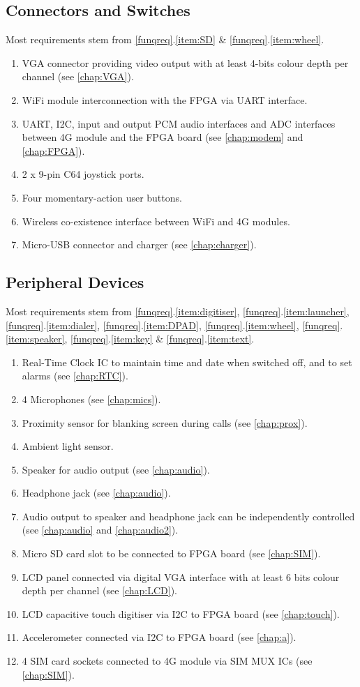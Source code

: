 \subsection{Connectors and Switches}
Most requirements stem from \ref{funqreq}.\ref{item:SD} \& \ref{funqreq}.\ref{item:wheel}.
\begin{enumerate}
\item VGA connector providing video output with at least 4-bits colour depth per channel (see \autoref{chap:VGA}).
\item WiFi module interconnection with the FPGA via UART interface.
\item UART, I2C, input and output PCM audio interfaces and ADC interfaces between 4G module and the FPGA board (see \autoref{chap:modem} and \autoref{chap:FPGA}).
\item 2 x 9-pin C64 joystick ports.
\item Four momentary-action user buttons.
\item Wireless co-existence interface between WiFi and 4G modules.
\item Micro-USB connector and charger (see \autoref{chap:charger}).
\end{enumerate}

\subsection{Peripheral Devices}
Most requirements stem from \ref{funqreq}.\ref{item:digitiser}, \ref{funqreq}.\ref{item:launcher}, \ref{funqreq}.\ref{item:dialer}, \ref{funqreq}.\ref{item:DPAD}, \ref{funqreq}.\ref{item:wheel}, \ref{funqreq}.\ref{item:speaker}, \ref{funqreq}.\ref{item:key} \& \ref{funqreq}.\ref{item:text}.
\begin{enumerate}
\item Real-Time Clock IC to maintain time and date when switched off, and to set alarms (see \autoref{chap:RTC}).
\item 4 Microphones (see \autoref{chap:mics}).
\item Proximity sensor for blanking screen during calls (see \autoref{chap:prox}).
\item Ambient light sensor.
\item Speaker for audio output (see \autoref{chap:audio}).
\item Headphone jack (see \autoref{chap:audio}).
\item Audio output to speaker and headphone jack can be independently controlled (see \autoref{chap:audio} and \autoref{chap:audio2}).
\item Micro SD card slot to be connected to FPGA board (see \autoref{chap:SIM}).
\item LCD panel connected via digital VGA interface with at least 6 bits colour depth per channel (see \autoref{chap:LCD}).
\item LCD capacitive touch digitiser via I2C to FPGA board (see \autoref{chap:touch}).
\item Accelerometer connected via I2C to FPGA board (see \autoref{chap:a}).
\item 4 SIM card sockets connected to 4G module via SIM MUX ICs (see \autoref{chap:SIM}).
\end{enumerate}


